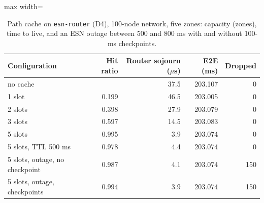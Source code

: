 \begin{table}[htbp]
\centering
\caption{Path cache on \texttt{esn-router} (D4), 100-node network, five zones: capacity (zones), time to live, and an ESN outage between 500 and 800 ms with and without 100-ms checkpoints.}
\label{tab:cache}
\begin{adjustbox}{max width=\textwidth}
\begin{tabular}{lrrrr}
\toprule
Configuration & Hit ratio & Router sojourn ($\mu$s) & E2E (ms) & Dropped \\
\midrule
no cache &  & 37.5 & 203.107 & 0 \\
1 slot & 0.199 & 46.5 & 203.005 & 0 \\
2 slots & 0.398 & 27.9 & 203.079 & 0 \\
3 slots & 0.597 & 14.5 & 203.083 & 0 \\
5 slots & 0.995 & 3.9 & 203.074 & 0 \\
5 slots, TTL 500 ms & 0.978 & 4.4 & 203.074 & 0 \\
5 slots, outage, no checkpoint & 0.987 & 4.1 & 203.074 & 150 \\
5 slots, outage, checkpoints & 0.994 & 3.9 & 203.074 & 150 \\
\bottomrule
\end{tabular}
\end{adjustbox}
\end{table}
